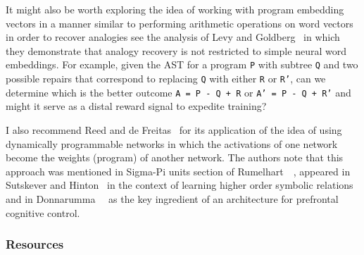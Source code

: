 It might also be worth exploring the idea of working with program embedding vectors in a manner similar to performing arithmetic operations on word vectors in order to recover analogies \emdash{} see the analysis of Levy and Goldberg~\cite{LevyandGoldbergCONIL-14} in which they demonstrate that analogy recovery is not restricted to simple neural word embeddings. For example, given the AST for a program {\tt{P}} with subtree {\tt{Q}} and two possible repairs that correspond to replacing {\tt{Q}} with either {\tt{R}} or {\tt{R'}}, can we determine which is the better outcome {\tt{A = P - Q + R}} or {\tt{A' = P - Q + R'}} and might it serve as a distal reward signal to expedite training?

I also recommend Reed and de Freitas~\cite{ReedandDeFreitasCoRR-15} for its application of the idea of using dynamically programmable networks in which the activations of one network become the weights (program) of another network.  The authors note that this approach was mentioned in Sigma-Pi units section of Rumelhart~\etal{}~\cite{RumelhartetalPDP-86b}, appeared in Sutskever and Hinton~\cite{SutskeverandHintonNIPS-09} in the context of learning higher order symbolic relations and in Donnarumma~\etal{}~\cite{DonnarummaetalIJNS-15} as the key ingredient of an architecture for prefrontal cognitive control.


\subsubsection*{Resources}


